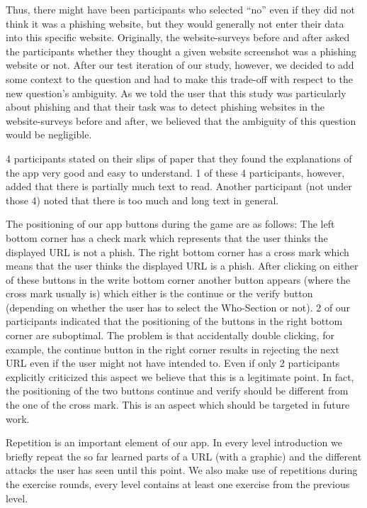 \begin{description}[leftmargin=0cm]
Thus, there might have been participants who selected ``no'' even if they did not think it was a phishing website, but they would generally not enter their data into this specific website.
Originally, the website-surveys before and after asked the participants whether they thought a given website screenshot was a phishing website or not.
After our test iteration of our study, however, we decided to add some context to the question and had to make this trade-off with respect to the new question's ambiguity.
As we told the user that this study was particularly about phishing and that their task was to detect phishing websites in the website-surveys before and after, we believed that the ambiguity of this question would be negligible.
	\item[Explanations and Comprehensibility:]
4 participants stated on their slips of paper that they found the explanations of the app very good and easy to understand.
1 of these 4 participants, however, added that there is partially much text to read.
Another participant (not under those 4) noted that there is too much and long text in general.
	\item[Button Positioning:] The positioning of our app buttons during the game are as follows: 
The left bottom corner has a check mark which represents that the user thinks the displayed URL is not a phish.
The right bottom corner has a cross mark which means that the user thinks the displayed URL is a phish.
After clicking on either of these buttons in the write bottom corner another button appears (where the cross mark usually is) which either is the continue or the verify button (depending on whether the user has to select the Who-Section or not).
2 of our participants indicated that the positioning of the buttons in the right bottom corner are suboptimal.
The problem is that accidentally double clicking, for example, the continue button in the right corner results in rejecting the next URL even if the user might not have intended to.
Even if only 2 participants explicitly criticized this aspect we believe that this is a legitimate point.
In fact, the positioning of the two buttons continue and verify should be different from the one of the cross mark.
This is an aspect which should be targeted in future work. 
	\item[Repetition:]
Repetition is an important element of our app.
In every level introduction we briefly repeat the so far learned parts of a URL (with a graphic) and the different attacks the user has seen until this point.
We also make use of repetitions during the exercise rounds, every level contains at least one exercise from the previous level.

\end{description}
